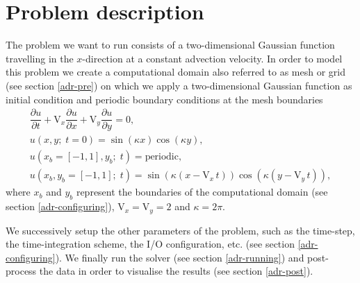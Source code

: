 \section{Problem description}
The problem we want to run consists of a two-dimensional Gaussian function travelling in the $x$-direction
at a constant advection velocity. In order to model this problem we create a computational domain also 
referred to as mesh or grid (see section \ref{adr-pre}) on which we apply a two-dimensional Gaussian 
function as initial condition and periodic boundary conditions at the mesh boundaries
%
\begin{equation}
\begin{array}{l}
\dfrac{\partial u}{\partial t} + \text{V}_{x}\dfrac{\partial u}{\partial x} + \text{V}_{y}\dfrac{\partial u}{\partial y} = 0,\\[1em]
u(x,y;\;t=0) = \sin(\kappa x) \cos(\kappa y),\\[1em]
u(x_{b} = [-1, 1],y_{b};\;t) = \text{periodic},\\[1em]
u(x_{b},y_{b} = [-1, 1];\;t) = \sin(\kappa (x - \text{V}_{x}\,t)) \cos(\kappa (y - \text{V}_{y}\,t)),
\end{array}
\label{eq:advection-2d}
\end{equation}
%
where $x_{b}$ and $y_{b}$ represent the boundaries of the computational domain (see section \ref{adr-configuring}), 
$\text{V}_{x} = \text{V}_{y} = 2$ and $\kappa = 2\pi$.

We successively setup the other parameters of the problem, such as the time-step, the time-integration 
scheme, the I/O configuration, etc. (see section \ref{adr-configuring}). We finally run the solver (see section 
\ref{adr-running}) and post-process the data in order to visualise the results (see section \ref{adr-post}).

